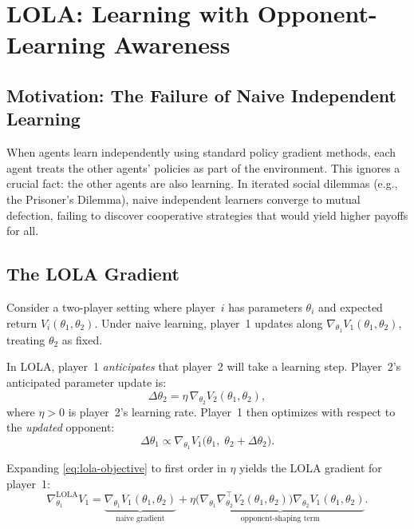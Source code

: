 \documentclass[11pt,a4paper]{article}
\begin{document}
\section{LOLA: Learning with Opponent-Learning Awareness}
\label{sec:lola}

\subsection{Motivation: The Failure of Naive Independent Learning}

When agents learn independently using standard policy gradient methods,
each agent treats the other agents' policies as part of the environment.
This ignores a crucial fact: the other agents are also learning.  In
iterated social dilemmas (e.g., the Prisoner's Dilemma), naive
independent learners converge to mutual defection, failing to discover
cooperative strategies that would yield higher payoffs for all.

\subsection{The LOLA Gradient}

Consider a two-player setting where player~$i$ has parameters
$\theta_i$ and expected return $V_i(\theta_1, \theta_2)$.  Under naive
learning, player~1 updates along $\nabla_{\theta_1} V_1(\theta_1, \theta_2)$,
treating $\theta_2$ as fixed.

\begin{definition}
\label{def:lola}
In LOLA, player~1 \emph{anticipates} that player~2 will take a learning
step.  Player~2's anticipated parameter update is:
\begin{equation}
\label{eq:opponent-step}
  \Delta\theta_2 = \eta\, \nabla_{\theta_2} V_2(\theta_1, \theta_2),
\end{equation}
where $\eta > 0$ is player~2's learning rate.  Player~1 then optimizes
with respect to the \emph{updated} opponent:
\begin{equation}
\label{eq:lola-objective}
  \Delta\theta_1 \propto \nabla_{\theta_1}
  V_1\bigl(\theta_1,\; \theta_2 + \Delta\theta_2\bigr).
\end{equation}
\end{definition}

\begin{proposition}
\label{prop:lola-gradient}
Expanding \eqref{eq:lola-objective} to first order in $\eta$ yields the
LOLA gradient for player~1:
\begin{equation}
\label{eq:lola-gradient}
  \nabla_{\theta_1}^{\mathrm{LOLA}} V_1
  = \underbrace{\nabla_{\theta_1} V_1(\theta_1, \theta_2)}_{\text{naive gradient}}
  + \eta \underbrace{
    \bigl(\nabla_{\theta_1} \nabla_{\theta_2}^\top V_2(\theta_1, \theta_2)\bigr)
    \nabla_{\theta_2} V_1(\theta_1, \theta_2)
  }_{\text{opponent-shaping term}}.
\end{equation}
\end{proposition}
\end{document}
